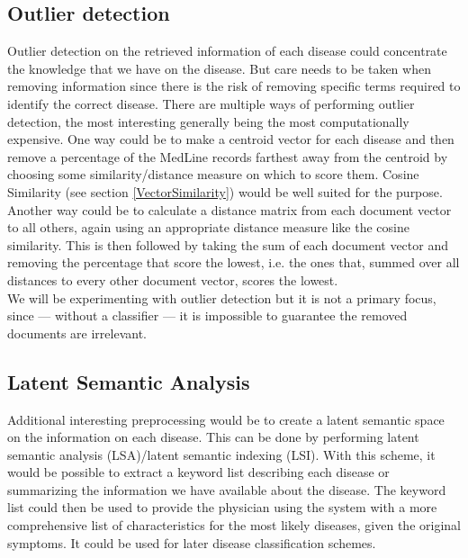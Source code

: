 \subsection{Outlier detection}

Outlier detection on the retrieved information of each disease could
concentrate the knowledge that we have on the disease. But care needs
to be taken when removing information since there is the risk of
removing specific terms required to identify the correct
disease. There are multiple ways of performing outlier detection, the
most interesting generally being the most computationally
expensive. One way could be to make a centroid vector for each disease
and then remove a percentage of the MedLine records farthest away from
the centroid by choosing some similarity/distance measure on which to
score them. Cosine Similarity (see section \ref{VectorSimilarity}) would be well
suited for the purpose. Another way could be to calculate a distance
matrix from each document vector to all others, again using an
appropriate distance measure like the cosine similarity. This is then
followed by taking the sum of each document vector and removing the
percentage that score the lowest, i.e. the ones that, summed over all
distances to every other document vector, scores the lowest. \\

  We will be
experimenting with outlier detection but it is not a primary focus,
since --- without a classifier --- it is impossible to guarantee the
removed documents are irrelevant.

\subsection{Latent Semantic Analysis\label{LSA}}

Additional interesting preprocessing would be to create a latent
semantic space on the information on each disease. This can be done by
performing latent semantic analysis (LSA)/latent semantic indexing
(LSI). With this scheme, it would be possible to extract a keyword
list describing each disease or summarizing the information we have
available about the disease. The keyword list could then be used to
provide the physician using the system with a more comprehensive list
of characteristics for the most likely diseases, given the original
symptoms. It could be used for later disease classification schemes. \\

